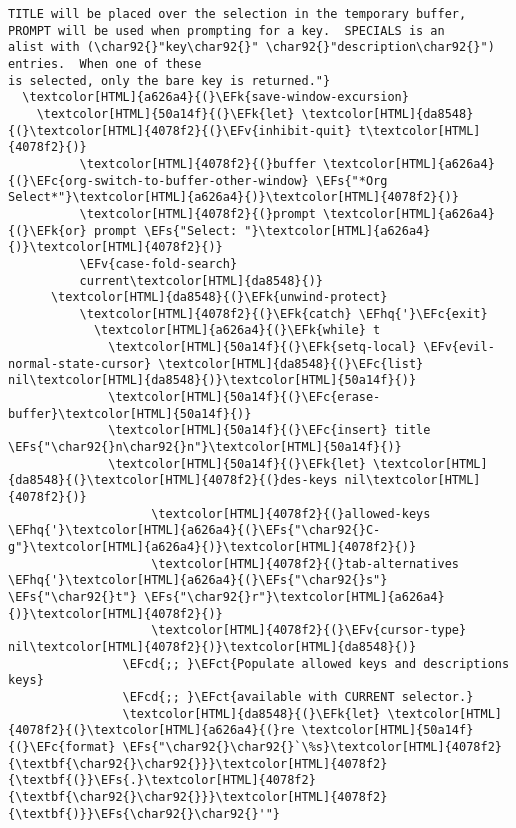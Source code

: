 \documentclass{scrartcl}
\newcommand{\EFk}[1]{\textcolor{EFk}{#1}} %
\newcommand{\EFs}[1]{\textcolor{EFs}{#1}} %
\newcommand{\EFct}[1]{\textcolor{EFct}{#1}} %
\newcommand{\EFc}[1]{\textcolor{EFc}{#1}} %
\newcommand{\EFv}[1]{\textcolor{EFv}{#1}} %
\newcommand{\EFcd}[1]{\textcolor{EFcd}{#1}} %
\newcommand{\EFhq}[1]{\textcolor{EFhq}{#1}} %
\begin{document}
\begin{Code}
\begin{Verbatim}[]
TITLE will be placed over the selection in the temporary buffer,
PROMPT will be used when prompting for a key.  SPECIALS is an
alist with (\char92{}"key\char92{}" \char92{}"description\char92{}") entries.  When one of these
is selected, only the bare key is returned."}
  \textcolor[HTML]{a626a4}{(}\EFk{save-window-excursion}
    \textcolor[HTML]{50a14f}{(}\EFk{let} \textcolor[HTML]{da8548}{(}\textcolor[HTML]{4078f2}{(}\EFv{inhibit-quit} t\textcolor[HTML]{4078f2}{)}
          \textcolor[HTML]{4078f2}{(}buffer \textcolor[HTML]{a626a4}{(}\EFc{org-switch-to-buffer-other-window} \EFs{"*Org Select*"}\textcolor[HTML]{a626a4}{)}\textcolor[HTML]{4078f2}{)}
          \textcolor[HTML]{4078f2}{(}prompt \textcolor[HTML]{a626a4}{(}\EFk{or} prompt \EFs{"Select: "}\textcolor[HTML]{a626a4}{)}\textcolor[HTML]{4078f2}{)}
          \EFv{case-fold-search}
          current\textcolor[HTML]{da8548}{)}
      \textcolor[HTML]{da8548}{(}\EFk{unwind-protect}
          \textcolor[HTML]{4078f2}{(}\EFk{catch} \EFhq{'}\EFc{exit}
            \textcolor[HTML]{a626a4}{(}\EFk{while} t
              \textcolor[HTML]{50a14f}{(}\EFk{setq-local} \EFv{evil-normal-state-cursor} \textcolor[HTML]{da8548}{(}\EFc{list} nil\textcolor[HTML]{da8548}{)}\textcolor[HTML]{50a14f}{)}
              \textcolor[HTML]{50a14f}{(}\EFc{erase-buffer}\textcolor[HTML]{50a14f}{)}
              \textcolor[HTML]{50a14f}{(}\EFc{insert} title \EFs{"\char92{}n\char92{}n"}\textcolor[HTML]{50a14f}{)}
              \textcolor[HTML]{50a14f}{(}\EFk{let} \textcolor[HTML]{da8548}{(}\textcolor[HTML]{4078f2}{(}des-keys nil\textcolor[HTML]{4078f2}{)}
                    \textcolor[HTML]{4078f2}{(}allowed-keys \EFhq{'}\textcolor[HTML]{a626a4}{(}\EFs{"\char92{}C-g"}\textcolor[HTML]{a626a4}{)}\textcolor[HTML]{4078f2}{)}
                    \textcolor[HTML]{4078f2}{(}tab-alternatives \EFhq{'}\textcolor[HTML]{a626a4}{(}\EFs{"\char92{}s"} \EFs{"\char92{}t"} \EFs{"\char92{}r"}\textcolor[HTML]{a626a4}{)}\textcolor[HTML]{4078f2}{)}
                    \textcolor[HTML]{4078f2}{(}\EFv{cursor-type} nil\textcolor[HTML]{4078f2}{)}\textcolor[HTML]{da8548}{)}
                \EFcd{;; }\EFct{Populate allowed keys and descriptions keys}
                \EFcd{;; }\EFct{available with CURRENT selector.}
                \textcolor[HTML]{da8548}{(}\EFk{let} \textcolor[HTML]{4078f2}{(}\textcolor[HTML]{a626a4}{(}re \textcolor[HTML]{50a14f}{(}\EFc{format} \EFs{"\char92{}\char92{}`\%s}\textcolor[HTML]{4078f2}{\textbf{\char92{}\char92{}}}\textcolor[HTML]{4078f2}{\textbf{(}}\EFs{.}\textcolor[HTML]{4078f2}{\textbf{\char92{}\char92{}}}\textcolor[HTML]{4078f2}{\textbf{)}}\EFs{\char92{}\char92{}'"}

\end{Verbatim}
\end{Code}
\end{document}
